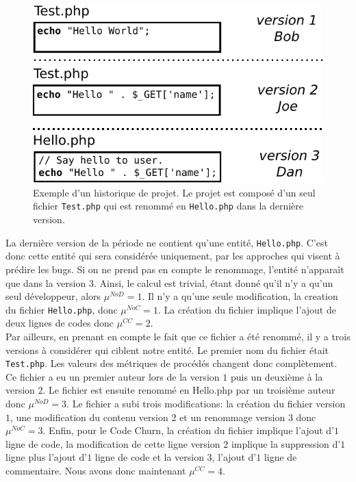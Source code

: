 \begin{figure}[t]
	\centering
	\includegraphics[width=0.8\linewidth,keepaspectratio]{data/figures/example.pdf}
	\caption{Exemple d'un historique de projet. Le projet est composé d'un seul fichier \texttt{Test.php} qui est renommé en \texttt{Hello.php} dans la dernière version.}
	\label{fig:example}
\end{figure}

La dernière version de la période ne contient qu'une entité, \texttt{Hello.php}. C'est donc cette entité qui sera considérée uniquement, par les approches qui visent à prédire les bugs. Si on ne prend pas en compte le renommage, l'entité n'apparaît que dans la version 3. Ainsi, le calcul est trivial, étant donné qu'il n'y a qu'un seul développeur, alors $\mu^{NoD}=1$. Il n'y a qu'une seule modification, la creation du fichier \texttt{Hello.php}, donc $\mu^{NoC}=1$. La création du fichier implique l'ajout de deux lignes de codes donc $\mu^{CC}=2$.\\

Par ailleurs, en prenant en compte le fait que ce fichier a été renommé, il y a trois versions à considérer qui ciblent notre entité. Le premier nom du fichier était \texttt{Test.php}. Les valeurs des métriques de procédés changent donc complètement. Ce fichier a eu un premier auteur lors de la version $1$ puis un deuxième à la version $2$. Le fichier est ensuite renommé en Hello.php par un troisième auteur donc $\mu^{NoD}=3$. Le fichier a subi trois modifications: la création du fichier version $1$, une modification du contenu version $2$ et un renommage version $3$ donc $\mu^{NoC}=3$. Enfin, pour le Code Churn, la création du fichier implique l'ajout d'$1$ ligne de code, la modification de cette ligne version $2$ implique la suppression d'$1$ ligne plus l'ajout d'$1$ ligne de code et la version 3, l'ajout d'$1$ ligne de commentaire. Nous avons donc maintenant $\mu^{CC}=4$. \\

